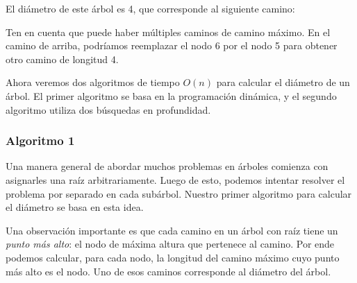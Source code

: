 El diámetro de este árbol es 4, que corresponde al siguiente camino:
\begin{center}
\end{center}
Ten en cuenta que puede haber múltiples caminos de camino máximo.
En el camino de arriba, podríamos reemplazar el nodo 6 por el nodo 5
para obtener otro camino de longitud 4.

Ahora veremos dos algoritmos de tiempo $O(n)$ para calcular el
diámetro de un árbol. El primer algoritmo se basa en la programación
dinámica, y el segundo algoritmo utiliza dos búsquedas en profundidad.

\subsubsection{Algoritmo 1}

Una manera general de abordar muchos problemas en árboles comienza
con asignarles una raíz arbitrariamente. Luego de esto, podemos
intentar resolver el problema por separado en cada subárbol. Nuestro
primer algoritmo para calcular el diámetro se basa en esta idea.

Una observación importante es que cada camino en un árbol con raíz
tiene un \emph{punto más alto}: el nodo de máxima altura que pertenece
al camino. Por ende podemos calcular, para cada nodo, la longitud
del camino máximo cuyo punto más alto es el nodo. Uno de esos caminos
corresponde al diámetro del árbol.

